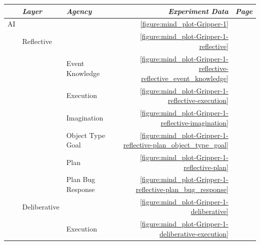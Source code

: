 \begin{table}
  \centering
  \begin{tabular}{lllrr}
    ~         & \emph{Layer}      & \emph{Agency}      & \emph{Experiment Data}                                                      & \emph{Page} \\
    \hline AI &                   &                    & \autoref{figure:mind_plot-Gripper-1}                                        & \pageref{figure:mind_plot-Gripper-1} \\
    ~         & Reflective        &                    & \autoref{figure:mind_plot-Gripper-1-reflective}                             & \pageref{figure:mind_plot-Gripper-1-reflective} \\
    ~         &                   & Event Knowledge    & \autoref{figure:mind_plot-Gripper-1-reflective-reflective_event_knowledge}  & \pageref{figure:mind_plot-Gripper-1-reflective-reflective_event_knowledge} \\
    ~         &                   & Execution          & \autoref{figure:mind_plot-Gripper-1-reflective-execution}                   & \pageref{figure:mind_plot-Gripper-1-reflective-execution} \\
    ~         &                   & Imagination        & \autoref{figure:mind_plot-Gripper-1-reflective-imagination}                 & \pageref{figure:mind_plot-Gripper-1-reflective-imagination} \\
    ~         &                   & Object Type Goal   & \autoref{figure:mind_plot-Gripper-1-reflective-plan_object_type_goal}       & \pageref{figure:mind_plot-Gripper-1-reflective-plan_object_type_goal} \\
    ~         &                   & Plan               & \autoref{figure:mind_plot-Gripper-1-reflective-plan}                        & \pageref{figure:mind_plot-Gripper-1-reflective-plan} \\
    ~         &                   & Plan Bug Response  & \autoref{figure:mind_plot-Gripper-1-reflective-plan_bug_response}           & \pageref{figure:mind_plot-Gripper-1-reflective-plan_bug_response} \\
    ~         & Deliberative      &                    & \autoref{figure:mind_plot-Gripper-1-deliberative}                           & \pageref{figure:mind_plot-Gripper-1-deliberative} \\
    ~         &                   & Execution          & \autoref{figure:mind_plot-Gripper-1-deliberative-execution}                 & \pageref{figure:mind_plot-Gripper-1-deliberative-execution} \\

\end{tabular}
\end{table}
